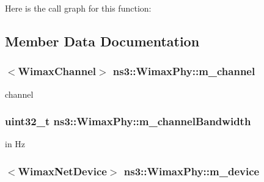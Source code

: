 Here is the call graph for this function\+:




\subsection{Member Data Documentation}
\subsubsection[{\texorpdfstring{m\+\_\+channel}{m_channel}}]{$<${\bf Wimax\+Channel}$>$ ns3\+::\+Wimax\+Phy\+::m\+\_\+channel\hspace{0.3cm}{\ttfamily [private]}}\hypertarget{classns3_1_1WimaxPhy_a79acb3a5eb3eabe15877fc1fd5facf10}{}\label{classns3_1_1WimaxPhy_a79acb3a5eb3eabe15877fc1fd5facf10}


channel 

\subsubsection[{\texorpdfstring{m\+\_\+channel\+Bandwidth}{m_channelBandwidth}}]{\setlength{\rightskip}{0pt plus 5cm}uint32\+\_\+t ns3\+::\+Wimax\+Phy\+::m\+\_\+channel\+Bandwidth\hspace{0.3cm}{\ttfamily [private]}}\hypertarget{classns3_1_1WimaxPhy_a3340a4f7c5ff2d51553ee6515d552edf}{}\label{classns3_1_1WimaxPhy_a3340a4f7c5ff2d51553ee6515d552edf}


in Hz 

\subsubsection[{\texorpdfstring{m\+\_\+device}{m_device}}]{$<${\bf Wimax\+Net\+Device}$>$ ns3\+::\+Wimax\+Phy\+::m\+\_\+device\hspace{0.3cm}{\ttfamily [private]}}\hypertarget{classns3_1_1WimaxPhy_a6af0da696b50fa3210a37cbaedccc1f6}{}\label{classns3_1_1WimaxPhy_a6af0da696b50fa3210a37cbaedccc1f6}


